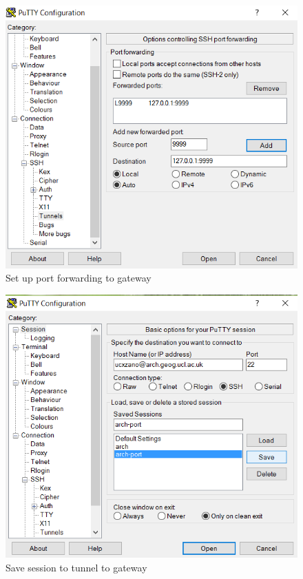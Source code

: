 \documentclass[a4paper]{article}
\begin{document}
\begin{figure}[p]
  \centering
    \includegraphics[width=\textwidth]{figures/putty2_setup_tunnel.png}
  \caption{Set up port forwarding to gateway}
  \label{fig:putty2}
\end{figure}

\begin{figure}[p]
  \centering
    \includegraphics[width=\textwidth]{figures/putty3_save_tunnel_session.png}
  \caption{Save session to tunnel to gateway}
  \label{fig:putty3}
\end{figure}
\end{document}
